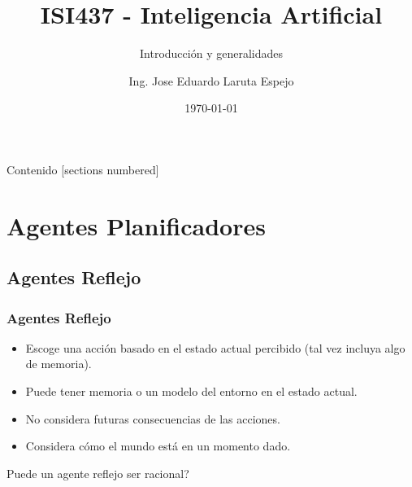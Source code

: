\documentclass[10pt]{beamer}
\title{ISI437 - Inteligencia Artificial}
\subtitle{Introducción y generalidades}
\date{\today}
\author{Ing. Jose Eduardo Laruta Espejo}
\institute{Universidad La Salle - Bolivia}
\begin{document}
\maketitle

\begin{frame}[allowframebreaks]{Contenido}
  [sections numbered]
  \tableofcontents[]
\end{frame}


\section{Agentes Planificadores}
\subsection{Agentes Reflejo}
\begin{frame}
    \frametitle{Agentes Reflejo}
    \begin{itemize}
        \item Escoge una acción basado en el estado actual percibido (tal vez incluya algo de memoria).
        \item Puede tener memoria o un modelo del entorno en el estado actual.
        \item No considera futuras consecuencias de las acciones.
        \item Considera cómo el mundo \alert{está} en un momento dado.
    \end{itemize}
    \pause
    Puede un agente reflejo ser racional?
  
\end{frame}
\end{document}
